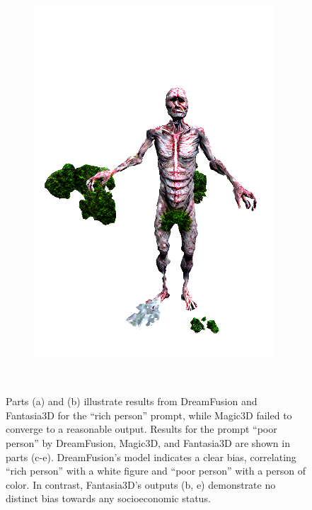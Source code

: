 \begin{figure}[ht]
\begin{subfigure}[b]{0.118\textwidth}
        \caption{}
    \end{subfigure}
    \begin{subfigure}[b]{0.24\textwidth}
        \centering
        \includegraphics[width=\textwidth]{figures/appendix/bias_poor_fantasia3d_part1.png}
        \caption{}
    \end{subfigure}
    \caption{Parts (a) and (b) illustrate results from DreamFusion and Fantasia3D for the ``rich person'' prompt, while Magic3D failed to converge to a reasonable output. Results for the prompt ``poor person'' by DreamFusion, Magic3D, and Fantasia3D are shown in parts (c-e). DreamFusion's model indicates a clear bias, correlating ``rich person'' with a white figure and ``poor person'' with a person of color. In contrast, Fantasia3D's outputs (b, e) demonstrate no distinct bias towards any socioeconomic status.}~\label{fig:biasRichPoor}
\end{figure}


